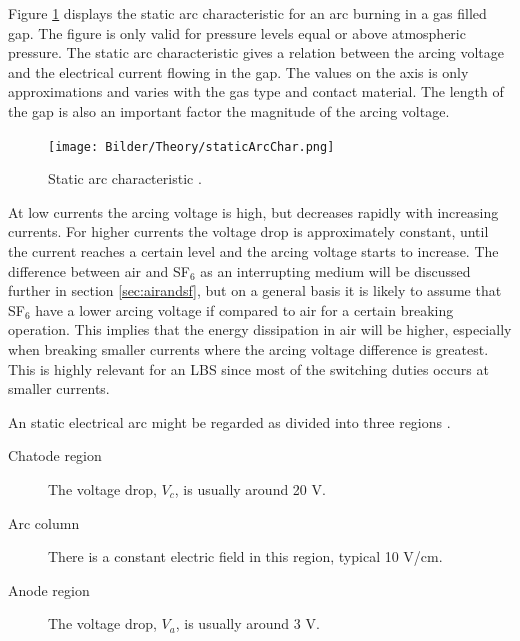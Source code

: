 \documentclass[10pt,a4paper]{article} %
\begin{document}
Figure \ref{fig:staticArcChar} displays the static arc characteristic for an arc burning in a gas filled gap. The figure is only valid for pressure levels equal or above atmospheric pressure. The static arc characteristic gives a relation between the arcing voltage and the electrical current flowing in the gap. The values on the axis is only approximations and varies with the gas type and contact material. The length of the gap is also an important factor the magnitude of the arcing voltage. 

\begin{figure}[H]
\centering
\texttt{[image: Bilder/Theory/staticArcChar.png]}
\caption{Static arc characteristic  \cite{bib:HVEbreak}.} \label{fig:staticArcChar}
\end{figure}

At low currents the arcing voltage is high, but decreases rapidly with increasing currents. For higher currents the voltage drop is approximately constant, until the current reaches a certain level and the arcing voltage starts to increase. The difference between air and SF$_6$ as an interrupting medium will be discussed further in section \ref{sec:airandsf}, but on a general basis it is likely to assume that SF${_6}$ have a lower arcing voltage if compared to air for a certain breaking operation. This implies that the energy dissipation in air will be higher, especially when breaking smaller currents where the arcing voltage difference is greatest. This is highly relevant for an LBS since most of the switching duties occurs at smaller currents.

An static electrical arc might be regarded as divided into three regions \cite{bib:HVEbreak}.
\begin{description}
\item[Chatode region] The voltage drop, $V_c$, is usually around 20 V.
\item[Arc column]	There is a constant electric field in this region, typical 10 V/cm.
\item[Anode region] The voltage drop, $V_a$, is usually around 3 V.
\end{description}
\end{document}
